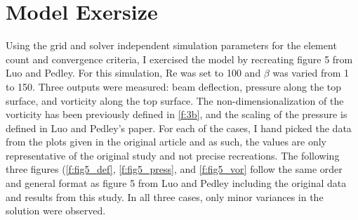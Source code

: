 \documentclass[10pt,english]{article}
\begin{document}
\section{Model Exersize}
Using the grid and solver independent simulation parameters for the element count and convergence criteria, I exercised the model by recreating figure 5 from Luo and Pedley.  For this simulation, Re was set to 100 and $\beta$ was varied from 1 to 150.  Three outputs were measured: beam deflection, pressure along the top surface, and vorticity along the top surface.  The non-dimensionalization of the vorticity has been previously defined in \cref{f:3b}, and the scaling of the pressure is defined in Luo and Pedley's paper.  For each of the cases, I hand picked the data from the plots given in the original article and as such, the values are only representative of the original study and not precise recreations.  The following three figures (\ref{f:fig5_def}, \ref{f:fig5_press}, and \ref{f:fig5_vor} follow the same order and general format as figure 5 from Luo and Pedley including the original data and results from this study.  In all three cases, only minor variances in the solution were observed.
\end{document}
